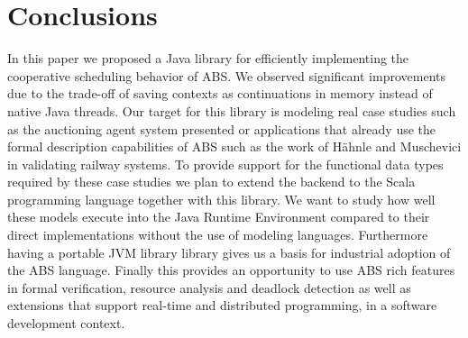 \section{Conclusions}
In this paper we proposed a Java library for efficiently implementing the cooperative scheduling behavior of ABS. We observed significant improvements due to the trade-off of saving contexts as continuations in memory instead of native Java threads. Our target for this library is modeling real case studies such as the auctioning agent system presented or applications that already use the formal description capabilities of ABS such as the work of Hähnle and Muschevici in validating railway systems\cite{railway}. To provide support for the functional data types required by these case studies we plan to extend the backend to the Scala programming language together with this library. We want to study how well these models execute into the Java Runtime Environment compared to their direct implementations without the use of modeling languages. Furthermore having a portable JVM library library gives us a basis for industrial adoption of the ABS language.  Finally this provides an opportunity to use ABS rich features in formal verification,  resource analysis and deadlock detection as well as extensions that support real-time and distributed programming, in a software development context. 
